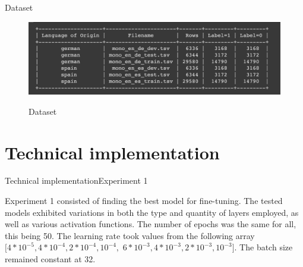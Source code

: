 \documentclass[
]{beamer}
\begin{document}
\begin{frame}{Dataset}

\begin{center}
    \begin{figure}[!h]
        \centering
        \includegraphics[width=\textwidth]{img/dataset.png}
        \label{fig:dataset}
        \caption{Dataset}
    \end{figure}
\end{center}

\end{frame}








\section[Technical implementation]{Technical implementation}

\begin{frame}{Technical implementation}{Experiment 1}

\hspace{0.4cm} Experiment 1 consisted of finding the best model for fine-tuning. The tested models exhibited variations in both the type and quantity of layers employed, as well as various activation functions. The number of epochs was the same for all, this being 50. The learning rate took values from the following array 
$[4*10^{-5}, 4*10^{-4}, 2*10^{-4}, 10^{-4},$ \newline $6*10^{-3}, 4*10^{-3}, 2*10^{-3}, 10^{-3}]$. The batch size remained constant at 32.

\end{frame}
\end{document}
